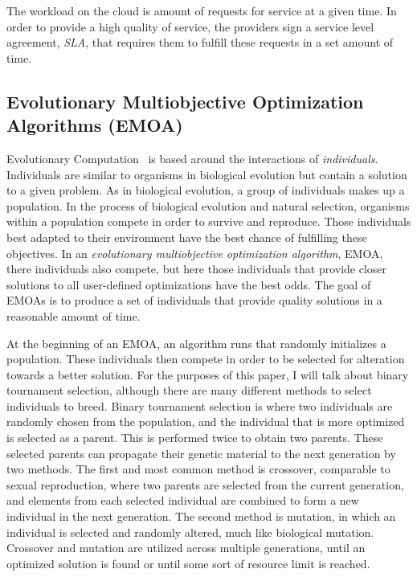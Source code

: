\documentclass{sig-alternate}
\begin{document}
The workload on the cloud is amount of requests for service at a given time. In order to provide a high quality of service, the providers sign a service level agreement, \emph{SLA}, that requires them to fulfill these requests in a set amount of time. 

\subsection{Evolutionary Multiobjective Optimization Algorithms (EMOA)}
\label{sec:EMOA}

Evolutionary Computation~\cite{poli08:fieldguide} is based around the interactions of \emph{individuals}. Individuals are similar to organisms in biological evolution but contain a solution to a given problem. As in biological evolution, a group of individuals makes up a population. In the process of biological evolution and natural selection, organisms within a population compete in order to survive and reproduce. Those individuals best adapted to their environment have the best chance of fulfilling these objectives.  In an \emph{evolutionary multiobjective optimization algorithm}, EMOA, there individuals also compete, but here those individuals that provide closer solutions to all user-defined optimizations have the best odds. The goal of EMOAs is to produce a set of individuals that provide quality solutions in a reasonable amount of time. 

At the beginning of an EMOA, an algorithm runs that randomly initializes a population. These individuals then compete in order to be selected for alteration towards a better solution. For the purposes of this paper, I will talk about binary tournament selection, although there are many different methods to select individuals to breed. Binary tournament selection is where two individuals are randomly chosen from the population, and the individual that is more optimized is selected as a parent. This is performed twice to obtain two parents.  These selected parents can propagate their genetic material to the next generation by two methods. The first and most common method is crossover, comparable to sexual reproduction, where two parents are selected from the current generation, and elements from each selected individual are combined to form a new individual in the next generation. The second method is mutation, in which an individual is selected and randomly altered, much like biological mutation. Crossover and mutation are utilized across multiple generations, until an optimized solution is found or until some sort of resource limit is reached.
\end{document}
